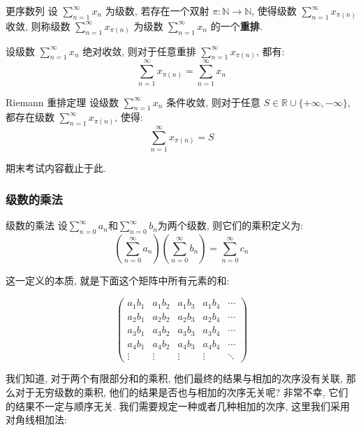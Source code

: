 \documentclass[a4paper,12pt]{ctexart}
\begin{document}
\begin{mydef}{更序数列}{}
设 $\sum_{n=1}^{\infty} x_n$ 为级数, 若存在一个双射 $\pi: \mathbb{N} \to \mathbb{N}$, 使得级数 $\sum_{n=1}^{\infty} x_{\pi(n)}$ 收敛, 则称级数 $\sum_{n=1}^{\infty} x_{\pi(n)}$ 为级数 $\sum_{n=1}^{\infty} x_n$ 的一个\textbf{重排}.
\end{mydef}

\begin{mythm}{}{}
设级数 $\sum_{n=1}^{\infty} x_n$ 绝对收敛, 则对于任意重排 $\sum_{n=1}^{\infty} x_{\pi(n)}$, 都有:
$$\sum_{n=1}^{\infty} x_{\pi(n)} = \sum_{n=1}^{\infty} x_n$$
\end{mythm}

\begin{mythm}{Riemann 重排定理}{}
设级数 $\sum_{n=1}^{\infty} x_n$ 条件收敛, 则对于任意 $S \in \mathbb{R} \cup \{+\infty, -\infty\}$, 都存在级数 $\sum_{n=1}^{\infty} x_{\pi(n)}$, 使得:
$$\sum_{n=1}^{\infty} x_{\pi(n)} = S$$
\end{mythm}

期末考试内容截止于此.

\subsubsection{级数的乘法}

\begin{mydef}{级数的乘法}{}
设$\sum_{n=0}^{\infty} a_n$和$\sum_{n=0}^{\infty} b_n$为两个级数, 则它们的乘积定义为:
$$
\left( \sum_{n=0}^{\infty} a_n \right) \left( \sum_{n=0}^{\infty} b_n \right) = \sum_{n=0}^{\infty} c_n
$$

这一定义的本质, 就是下面这个矩阵中所有元素的和:

\[\begin{pmatrix}
    a_1 b_1 & a_1 b_2 & a_1 b_3 & a_1 b_4 & \cdots \\
    a_2 b_1 & a_2 b_2 & a_2 b_3 & a_2 b_4 & \cdots \\
    a_3 b_1 & a_3 b_2 & a_3 b_3 & a_3 b_4 & \cdots \\
    a_4 b_1 & a_4 b_2 & a_4 b_3 & a_4 b_4 & \cdots \\
    \vdots   & \vdots   & \vdots   & \vdots   & \ddots
\end{pmatrix}
\]

\end{mydef}

我们知道, 对于两个有限部分和的乘积, 他们最终的结果与相加的次序没有关联, 那么对于无穷级数的乘积, 他们的结果是否也与相加的次序无关呢? 非常不幸, 它们的结果不一定与顺序无关. 我们需要规定一种或者几种相加的次序, 这里我们采用对角线相加法:
\end{document}
